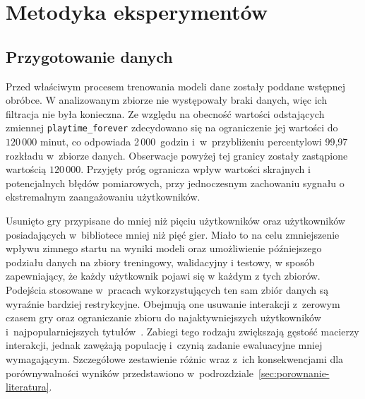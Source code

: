 \chapter{Metodyka eksperymentów}
\label{chap:metodologia}

\section{Przygotowanie danych}

Przed właściwym procesem trenowania modeli dane zostały poddane wstępnej obróbce. W analizowanym zbiorze nie występowały braki danych, więc ich filtracja nie była konieczna. Ze względu na obecność wartości odstających zmiennej \texttt{playtime\_forever} zdecydowano się na ograniczenie jej wartości do $120\,000$ minut, co odpowiada 2\,000~godzin i~w~przybliżeniu percentylowi 99{,}97 rozkładu w~zbiorze danych. Obserwacje powyżej tej granicy zostały zastąpione wartością $120\,000$. Przyjęty próg ogranicza wpływ wartości skrajnych i potencjalnych błędów pomiarowych, przy jednoczesnym zachowaniu sygnału o ekstremalnym zaangażowaniu użytkowników.

Usunięto gry przypisane do mniej niż pięciu użytkowników oraz użytkowników posiadających w~bibliotece mniej niż pięć gier. Miało to na celu zmniejszenie wpływu zimnego startu na wyniki modeli oraz umożliwienie późniejszego podziału danych na zbiory treningowy, walidacyjny i testowy, w sposób zapewniający, że każdy użytkownik pojawi się w każdym z tych zbiorów. Podejścia stosowane w~pracach wykorzystujących ten sam zbiór danych są wyraźnie bardziej restrykcyjne. Obejmują one usuwanie interakcji z~zerowym czasem gry oraz ograniczanie zbioru do najaktywniejszych użytkowników i~najpopularniejszych tytułów~\cite{bunga2021implicit,cheuque2019steam}. Zabiegi tego rodzaju zwiększają gęstość macierzy interakcji, jednak zawężają populację i~czynią zadanie ewaluacyjne mniej wymagającym. Szczegółowe zestawienie różnic wraz z~ich konsekwencjami dla porównywalności wyników przedstawiono w~podrozdziale~\ref{sec:porownanie-literatura}.

